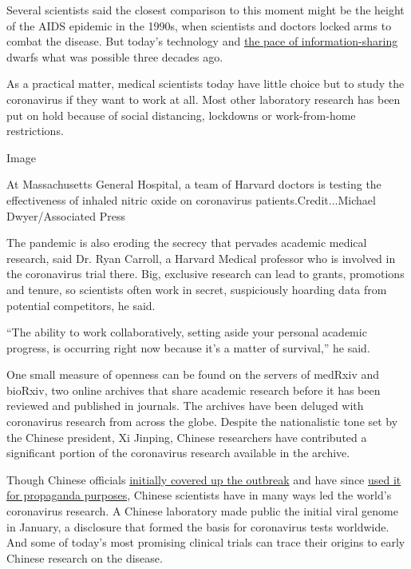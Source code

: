 Several scientists said the closest comparison to this moment might be
the height of the AIDS epidemic in the 1990s, when scientists and
doctors locked arms to combat the disease. But today's technology and
\href{https://www.sciencemag.org/news/2020/02/completely-new-culture-doing-research-coronavirus-outbreak-changes-how-scientists\#}{the
pace of information-sharing} dwarfs what was possible three decades ago.

As a practical matter, medical scientists today have little choice but
to study the coronavirus if they want to work at all. Most other
laboratory research has been put on hold because of social distancing,
lockdowns or work-from-home restrictions.

Image

At Massachusetts General Hospital, a team of Harvard doctors is testing
the effectiveness of inhaled nitric oxide on coronavirus
patients.Credit...Michael Dwyer/Associated Press

The pandemic is also eroding the secrecy that pervades academic medical
research, said Dr. Ryan Carroll, a Harvard Medical professor who is
involved in the coronavirus trial there. Big, exclusive research can
lead to grants, promotions and tenure, so scientists often work in
secret, suspiciously hoarding data from potential competitors, he said.

``The ability to work collaboratively, setting aside your personal
academic progress, is occurring right now because it's a matter of
survival,'' he said.

One small measure of openness can be found on the servers of medRxiv and
bioRxiv, two online archives that share academic research before it has
been reviewed and published in journals. The archives have been deluged
with coronavirus research from across the globe. Despite the
nationalistic tone set by the Chinese president, Xi Jinping, Chinese
researchers have contributed a significant portion of the coronavirus
research available in the archive.

Though Chinese officials
\href{https://www.nytimes3xbfgragh.onion/2020/02/01/world/asia/china-coronavirus.html}{initially
covered up the outbreak} and have since
\href{https://www.nytimes3xbfgragh.onion/2020/02/28/world/asia/china-coronavirus-response-propaganda.html}{used
it for propaganda purposes}, Chinese scientists have in many ways led
the world's coronavirus research. A Chinese laboratory made public the
initial viral genome in January, a disclosure that formed the basis for
coronavirus tests worldwide. And some of today's most promising clinical
trials can trace their origins to early Chinese research on the disease.


